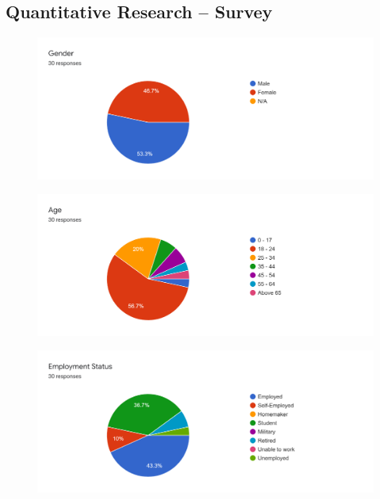\newpage

\begin{appendices}
  \section{Quantitative Research – Survey} \label{appendix:quantitative}
  
    \begin{figure}[H]
      \centering
      \includegraphics[width=18cm]{img/Survey/Q1.png}
    \end{figure}
    \begin{figure}[H]
      \centering
      \includegraphics[width=18cm]{img/Survey/Q2.png}
    \end{figure}
    \begin{figure}[H]
      \centering
      \includegraphics[width=18cm]{img/Survey/Q3.png}

\end{figure}
\end{appendices}
